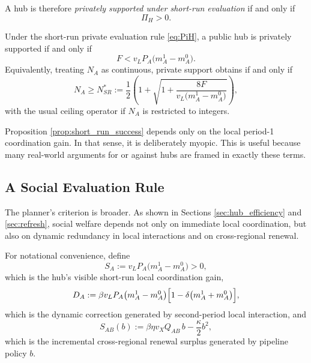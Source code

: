 A hub is therefore \emph{privately supported under short-run evaluation} if and only if
\[
\Pi_H>0.
\]

\begin{proposition}
\label{prop:short_run_success}
Under the short-run private evaluation rule \eqref{eq:PiH}, a public hub is privately supported if and only if
\begin{equation}
F<v_L P_A\bigl(m_A^1-m_A^0\bigr).
\label{eq:short_run_condition}
\end{equation}
Equivalently, treating $N_A$ as continuous, private support obtains if and only if
\begin{equation}
N_A\ge N_{SR}^*
:=
\frac{1}{2}
\left(
1+
\sqrt{
1+\frac{8F}{v_L\bigl(m_A^1-m_A^0\bigr)}
}
\right),
\label{eq:NSRstar}
\end{equation}
with the usual ceiling operator if $N_A$ is restricted to integers.
\end{proposition}

Proposition \ref{prop:short_run_success} depends only on the local period-1 coordination gain. In that sense, it is deliberately myopic. This is useful because many real-world arguments for or against hubs are framed in exactly these terms.

\subsection{A Social Evaluation Rule}

The planner's criterion is broader. As shown in Sections \ref{sec:hub_efficiency} and \ref{sec:refresh}, social welfare depends not only on immediate local coordination, but also on dynamic redundancy in local interactions and on cross-regional renewal.

For notational convenience, define
\begin{equation}
S_A
:=
v_L P_A\bigl(m_A^1-m_A^0\bigr)>0,
\label{eq:SA}
\end{equation}
which is the hub's visible short-run local coordination gain,
\begin{equation}
D_A
:=
\beta v_L P_A\bigl(m_A^1-m_A^0\bigr)\Bigl[1-\delta\bigl(m_A^1+m_A^0\bigr)\Bigr],
\label{eq:DA}
\end{equation}
which is the dynamic correction generated by second-period local interaction, and
\begin{equation}
S_{AB}(b)
:=
\beta\eta v_X Q_{AB}\,b-\frac{\kappa}{2}b^2,
\label{eq:SAB}
\end{equation}
which is the incremental cross-regional renewal surplus generated by pipeline policy $b$.

